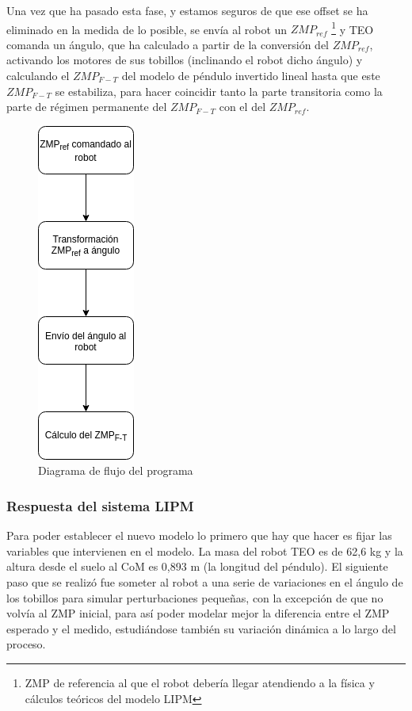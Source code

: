 \begin{enumerate}
Una vez que ha pasado esta fase, y estamos seguros de que ese offset se ha eliminado en la medida de lo posible, se envía al robot un $ZMP_{ref}$ \footnote{ZMP de referencia al que el robot debería llegar atendiendo a la física y cálculos teóricos del modelo LIPM} y TEO comanda un ángulo, que ha calculado a partir de la conversión del $ZMP_{ref}$, activando los motores de sus tobillos (inclinando el robot dicho ángulo) y calculando el $ZMP_{F-T}$ del modelo de péndulo invertido lineal hasta que este $ZMP_{F-T}$ se estabiliza, para hacer coincidir tanto la parte transitoria como la parte de régimen permanente del $ZMP_{F-T}$ con el del $ZMP_{ref}$.

\end{enumerate}

\begin{figure}[H]
\centering
\includegraphics[scale=0.5]{imagenes/apartado_5/52_diagrama_flujo1}
\caption{Diagrama de flujo del programa}
\label{figura52}
\end{figure}


\subsubsection{Respuesta del sistema LIPM}

Para poder establecer el nuevo modelo lo primero que hay que hacer es fijar las variables que intervienen en el modelo. La masa del robot TEO es de 62,6 kg y la altura desde el suelo al CoM es 0,893 m (la longitud del péndulo). El siguiente paso que se realizó fue someter al robot a una serie de variaciones en el ángulo de los tobillos para simular perturbaciones pequeñas, con la excepción de que no volvía al ZMP inicial, para así poder modelar mejor la diferencia entre el ZMP esperado y el medido, estudiándose también su variación dinámica a lo largo del proceso. 

